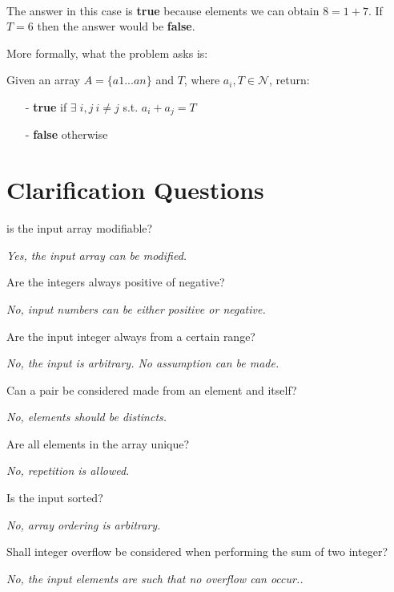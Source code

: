 \begin{example}
\\ \hfill
	\begin{itemize}
		\item[-] 	$A=\{1,3,7}\}$
		\item[-] 	$T = 8$
	\end{itemize}
The answer in this case is \textbf{true} because elements we can obtain $8=1+7$. 
If $T=6$ then the answer would be \textbf{false}.
\end{example}


More formally, what the problem asks is:
\begin{exercise}
	Given an array $A=\{a1...an\}$ and $T$, where $a_i, T \in \mathcal{N}$, return:
	\begin{itemize}
		\item[-] \textbf{true }if $\exists \;i,j \: i \neq j$ s.t. $a_i+a_j = T$
		\item[-] \textbf{false} otherwise
	\end{itemize}
\end{exercise}	
	

\section{Clarification Questions}
\begin{QandA}
	\item is the input array modifiable?
	\begin{answered}
		\textit{Yes, the input array can be modified.}
	\end{answered}
	
	\item Are the integers always positive of negative?  
	\begin{answered}
		\textit{No, input numbers can be either positive or negative.}
	\end{answered}
	\item Are the input integer always from a certain range?
	\begin{answered}
		\textit{No, the input is arbitrary. No assumption can be made.}
	\end{answered}
	\item Can a pair be considered made from an element and itself?
	\begin{answered}
		\textit{No, elements should be distincts.}
	\end{answered}
	\item Are all elements in the array unique?
	\begin{answered}
		\textit{No, repetition is allowed.}
	\end{answered}
	\item Is the input sorted?
	\begin{answered}
		\textit{No, array ordering is arbitrary.}
	\end{answered}
	\item Shall integer overflow be considered when performing the sum of two integer? 
	\begin{answered}
		\textit{No, the input elements are such that no overflow can occur..}
	\end{answered}
\end{QandA}


